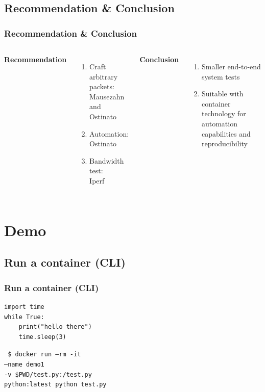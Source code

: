 \documentclass{beamer}
\begin{document}
\subsection{Recommendation \& Conclusion}
\begin{frame}
  \frametitle{Recommendation \& Conclusion}
  \begin{columns}[c] %
    \textbf{Recommendation}
    \begin{enumerate}
      \item Craft arbitrary packets: Mausezahn and Ostinato
      \item Automation: \\Ostinato
      \item Bandwidth test: \\Iperf
    \end{enumerate}
    \textbf{Conclusion}
    \begin{enumerate}
      \item Smaller end-to-end system tests
      \item Suitable with container technology for automation capabilities and reproducibility
    \end{enumerate}
  \end{columns}
\end{frame}

\section{Demo}
\subsection{Run a container (CLI)}
\begin{frame}[fragile]
  \frametitle{Run a container (CLI)}
  \begin{example}
    \begin{verbatim}
import time
while True:
    print("hello there")
    time.sleep(3)
    \end{verbatim}
  \end{example}

  \texttt{
    \$ docker run --rm -it \\\qquad
    --name demo1 \\\qquad
    -v \$PWD/test.py:/test.py \\\qquad
    python:latest python test.py
  }
\end{frame}
\end{document}
